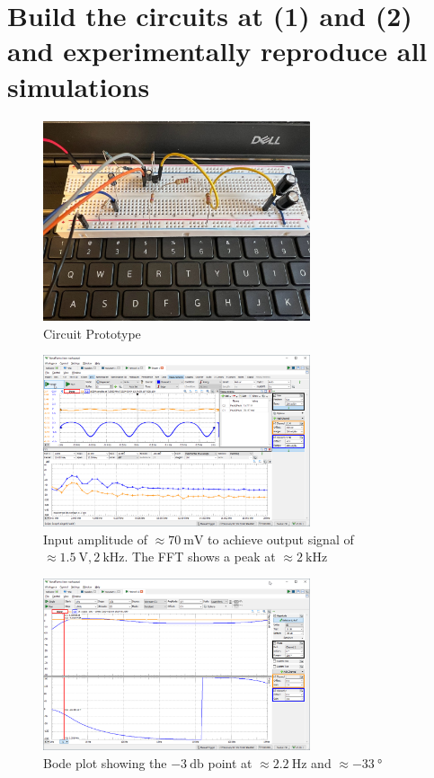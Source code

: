 \documentclass{article}
\begin{document}
	\section{Build the circuits at (1) and (2) and experimentally reproduce all simulations}
	
	\begin{figure}[H]
	    \centering
	    \includegraphics[width=0.7\textwidth]{photo-1}
	    \caption{Circuit Prototype}
	\end{figure}
	
	\begin{figure}[H]
	    \centering
	    \includegraphics[width=0.7\textwidth]{w1a}
	    \caption{Input amplitude of $\approx \SI{70}{\milli\volt}$ to achieve output signal of $\approx \SI{1.5}{\volt}, \SI{2}{\kilo\hertz}$. The FFT shows a peak at $\approx \SI{2}{\kilo\hertz}$ }
	\end{figure}

	\begin{figure}[H]
	    \centering
	    \includegraphics[width=0.7\textwidth]{w1b}
	    \caption{Bode plot showing the $\SI{-3}{\decibel}$ point at $\approx \SI{2.2}{\hertz}$ and $\approx \SI{-33}{\degree}$}
	\end{figure}
	
\end{document}
